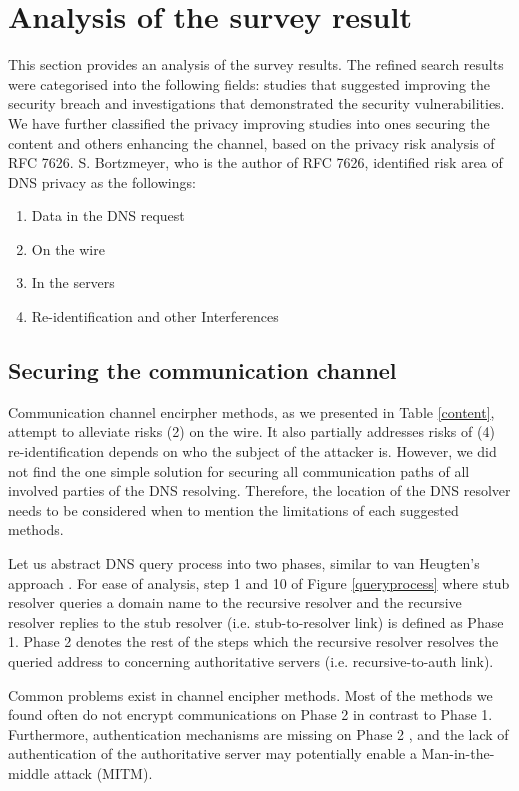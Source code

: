 \documentclass[a4paper,12pt]{article}
\begin{document}
\section{Analysis of the survey result}
This section provides an analysis of the survey results.
The refined search results were categorised into the following fields: studies that suggested improving the security breach and investigations that demonstrated the security vulnerabilities.
We have further classified the privacy improving studies into ones securing the content and others enhancing the channel, based on the privacy risk analysis of RFC 7626.
S. Bortzmeyer, who is the author of RFC 7626, identified risk area of DNS privacy as the followings\cite{rfc7626}: 
\begin{enumerate}
    \item Data in the DNS request
    \item On the wire
    \item In the servers
    \item Re-identification and other Interferences
\end{enumerate}

\subsection{Securing the communication channel}
Communication channel encirpher methods, as we presented in Table \ref{content}, attempt to alleviate risks (2) on the wire. It also partially addresses risks of (4) re-identification depends on who the subject of the attacker is. 
However, we did not find the one simple solution for securing all communication paths of all involved parties of the DNS resolving. Therefore, the location of the DNS resolver needs to be considered when to mention the limitations of each suggested methods.

Let us abstract DNS query process into two phases, similar to van Heugten's approach \cite{van2018privacy}.
For ease of analysis, step 1 and 10 of Figure \ref{queryprocess} where stub resolver queries a domain name to the recursive resolver and the recursive resolver replies to the stub resolver (i.e. stub-to-resolver link) is defined as Phase 1.
Phase 2 denotes the rest of the steps which the recursive resolver resolves the queried address to concerning authoritative servers (i.e. recursive-to-auth link).

Common problems exist in channel encipher methods.
Most of the methods we found often do not encrypt communications on Phase 2 in contrast to Phase 1.
Furthermore, authentication mechanisms are missing on Phase 2 \cite{I-D.bortzmeyer-dprive-step-2}, and the lack of authentication of the authoritative server may potentially enable a Man-in-the-middle attack (MITM).
\end{document}

